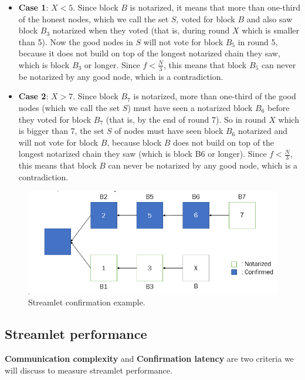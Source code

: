 \begin{itemize}
	\item  \textbf{Case 1}: $X<5$. Since block $B$ is notarized, it means that more than one-third of the honest nodes, which we call the set $S$, voted for block $B$ and also saw block $B_3$ notarized when they voted (that is, during round $X$ which is smaller than 5). Now the good nodes in $S$ will not vote for block $B_5$ in round 5, because it does not build on top of the longest notarized chain they saw, which is block $B_3$ or longer. Since $f<\frac{N}{3}$, this means that block $B_5$ can never be notarized by any good node, which is a contradiction.
	\item \textbf{Case 2}: $X>7$. Since block $B_7$ is notarized, more than one-third of the good nodes (which we call the set $S$) must have seen a notarized block $B_6$ before they voted for block $B_7$ (that is, by the end of round 7). So in round $X$ which is bigger than 7, the set $S$ of nodes must have seen block $B_6$ notarized and will not vote for block $B$, because block $B$ does not build on top of the longest notarized chain they saw (which is block B6 or longer). Since $f<\frac{N}{3}$, this means that block $B$ can never be notarized by any good node, which is a contradiction.
\end{itemize}
\begin{figure}[h!]
	\centering
	\includegraphics[width=0.5\linewidth]{Fig/15/F5}
	\caption{Streamlet confirmation example.}
	\label{fig:L15_f5}
\end{figure}

\subsection{Streamlet performance}
\textbf{Communication complexity} and \textbf{Confirmation latency} are two criteria we will discuss to measure streamlet performance. 
